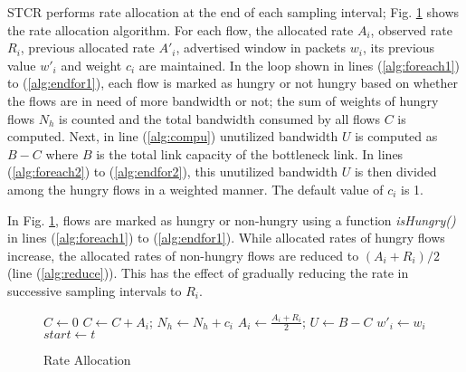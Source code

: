 \documentclass[conference]{../../IEEEtran}
\begin{document}
STCR performs rate allocation at the end of each sampling interval; Fig. \ref{fig:ratealloc} shows the rate allocation algorithm. For each flow, the allocated rate $A_i$, observed rate $R_i$, previous allocated rate $A'_i$, advertised window in packets $w_i$, its previous value $w'_i$ and weight $c_i$ are maintained. In the loop shown in lines (\ref{alg:foreach1}) to (\ref{alg:endfor1}), each flow is marked as hungry or not hungry based on whether the flows are in need of more bandwidth or not; the sum of weights of hungry flows $N_h$ is counted and the total bandwidth consumed by all flows $C$ is computed. Next, in line (\ref{alg:compu}) unutilized bandwidth $U$ is computed as $B - C$ where $B$ is the total link capacity of the bottleneck link. In lines (\ref{alg:foreach2}) to (\ref{alg:endfor2}), this unutilized bandwidth $U$ is then divided among the hungry flows in a weighted manner. The default value of $c_i$ is 1.

In Fig. \ref{fig:ratealloc}, flows are marked as hungry or non-hungry using a function \emph{isHungry()} in lines (\ref{alg:foreach1}) to (\ref{alg:endfor1}). While allocated rates of hungry flows increase, the allocated rates of non-hungry flows are reduced to $ (A_i+R_i) / 2$ (line (\ref{alg:reduce})). This has the effect of gradually reducing the rate in successive sampling intervals to $R_i$. 
\begin{figure}[hbt]
\centering
\begin{algorithmic}[1]
\STATE $ C \leftarrow 0 $
 \label{alg:foreach1}
	 \label{alg:ishungry}
		 { $C \leftarrow C + A_i$;}
		\STATE $N_h \leftarrow N_h + c_i$
	\ELSE 
		 {$A_i \leftarrow \frac{A_i + R_i}{2}$;} \label{alg:reduce}
	\ENDIF
\ENDFOR \label{alg:endfor1}
\STATE $ U \leftarrow B - C $ \label{alg:compu}
 \label{alg:foreach2}
	\ENDIF
	\STATE $w'_i \leftarrow w_i$
\ENDFOR \label{alg:endfor2}
\STATE $ start \leftarrow t $
\end{algorithmic}
\caption{Rate Allocation}
\label{fig:ratealloc}
\end{figure}
\end{document}
